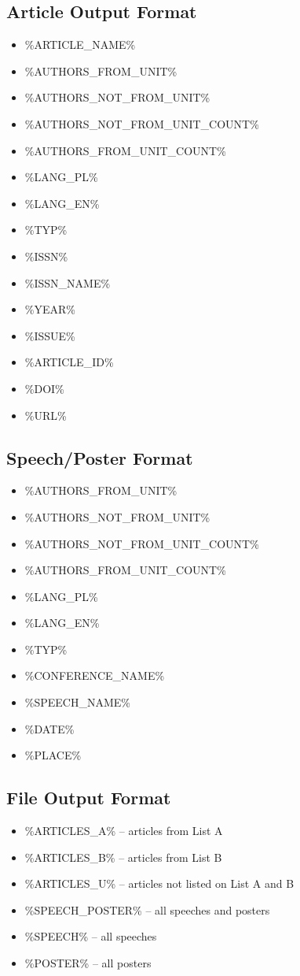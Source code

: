 \documentclass[a4paper,10pt]{article}
\begin{document}
\subsection{Article Output Format}
\begin{itemize}
\item \%ARTICLE\_NAME\% 
\item \%AUTHORS\_FROM\_UNIT\%
\item \%AUTHORS\_NOT\_FROM\_UNIT\%
\item \%AUTHORS\_NOT\_FROM\_UNIT\_COUNT\%
\item \%AUTHORS\_FROM\_UNIT\_COUNT\% 
\item \%LANG\_PL\%
\item \%LANG\_EN\% 
\item \%TYP\%
\item \%ISSN\%
\item \%ISSN\_NAME\%
\item \%YEAR\%
\item \%ISSUE\%
\item \%ARTICLE\_ID\%
\item \%DOI\%
\item \%URL\%
\end{itemize}
\subsection{Speech/Poster Format}
\begin{itemize}
\item \%AUTHORS\_FROM\_UNIT\%
\item \%AUTHORS\_NOT\_FROM\_UNIT\%
\item \%AUTHORS\_NOT\_FROM\_UNIT\_COUNT\%
\item \%AUTHORS\_FROM\_UNIT\_COUNT\% 
\item \%LANG\_PL\%
\item \%LANG\_EN\% 
\item \%TYP\%
\item \%CONFERENCE\_NAME\%
\item \%SPEECH\_NAME\%
\item \%DATE\%
\item \%PLACE\% 
\end{itemize}
\subsection{File Output Format}
\begin{itemize}
\item \%ARTICLES\_A\% – articles from List A
\item \%ARTICLES\_B\% – articles from List B
\item \%ARTICLES\_U\% – articles not listed on List A and B
\item \%SPEECH\_POSTER\% – all speeches and posters
\item \%SPEECH\% – all speeches
\item \%POSTER\% – all posters
\end{itemize}
\end{document}
